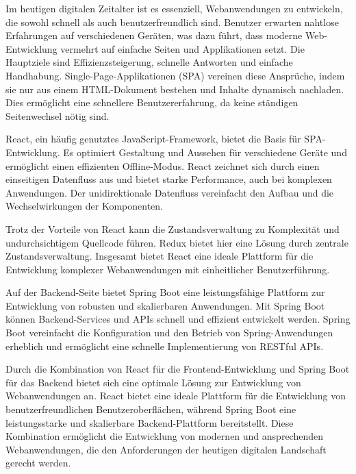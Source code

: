 	
	
	\makeatletter
		\makeatother
			Im heutigen digitalen Zeitalter ist es essenziell, Webanwendungen zu entwickeln, die sowohl schnell als auch benutzerfreundlich sind. Benutzer erwarten nahtlose Erfahrungen auf verschiedenen Geräten, was dazu führt, dass moderne Web-Entwicklung vermehrt auf einfache Seiten und Applikationen setzt. Die Hauptziele sind Effizienzsteigerung, schnelle Antworten und einfache Handhabung. Single-Page-Applikationen (SPA) vereinen diese Ansprüche, indem sie nur aus einem HTML-Dokument bestehen und Inhalte dynamisch nachladen. Dies ermöglicht eine schnellere Benutzererfahrung, da keine ständigen Seitenwechsel nötig sind.
			
			React, ein häufig genutztes JavaScript-Framework, bietet die Basis für SPA-Entwicklung. Es optimiert Gestaltung und Aussehen für verschiedene Geräte und ermöglicht einen effizienten Offline-Modus. React zeichnet sich durch einen einseitigen Datenfluss aus und bietet starke Performance, auch bei komplexen Anwendungen. Der unidirektionale Datenfluss vereinfacht den Aufbau und die Wechselwirkungen der Komponenten.
			
			Trotz der Vorteile von React kann die Zustandsverwaltung zu Komplexität und undurchsichtigem Quellcode führen. Redux bietet hier eine Lösung durch zentrale Zustandsverwaltung. Insgesamt bietet React eine ideale Plattform für die Entwicklung komplexer Webanwendungen mit einheitlicher Benutzerführung.
			
			Auf der Backend-Seite bietet Spring Boot eine leistungsfähige Plattform zur Entwicklung von robusten und skalierbaren Anwendungen. Mit Spring Boot können Backend-Services und APIs schnell und effizient entwickelt werden. Spring Boot vereinfacht die Konfiguration und den Betrieb von Spring-Anwendungen erheblich und ermöglicht eine schnelle Implementierung von RESTful APIs.
			
			Durch die Kombination von React für die Frontend-Entwicklung und Spring Boot für das Backend bietet sich eine optimale Lösung zur Entwicklung von Webanwendungen an. React bietet eine ideale Plattform für die Entwicklung von benutzerfreundlichen Benutzeroberflächen, während Spring Boot eine leistungsstarke und skalierbare Backend-Plattform bereitstellt. Diese Kombination ermöglicht die Entwicklung von modernen und ansprechenden Webanwendungen, die den Anforderungen der heutigen digitalen Landschaft gerecht werden.
		\makeatletter
	\makeatother
	
